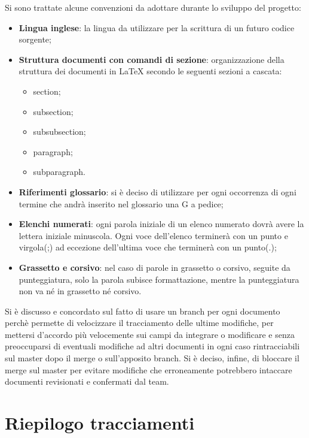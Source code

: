Si sono trattate alcune convenzioni da adottare durante lo sviluppo del 
progetto:
\begin{itemize}
\item \textbf{Lingua inglese}: la lingua da utilizzare per la scrittura di un 
futuro codice sorgente;
\item \textbf{Struttura documenti con comandi di sezione}: organizzazione della 
struttura dei documenti in \LaTeX{} secondo le seguenti sezioni a cascata:
\begin{itemize}
	\item section;
	\item subsection;
	\item subsubsection;
	\item paragraph;
	\item subparagraph.
\end{itemize}
\item \textbf{Riferimenti glossario}: si è deciso di utilizzare per ogni 
occorrenza di ogni termine che andrà inserito nel glossario una G a pedice;
\item \textbf{Elenchi numerati}: ogni parola iniziale di un elenco numerato 
dovrà avere la lettera iniziale minuscola. Ogni voce dell'elenco terminerà con 
un punto e virgola(;) ad eccezione dell'ultima voce che terminerà con un 
punto(.);
\item \textbf{Grassetto e corsivo}: nel caso di parole in grassetto o corsivo, 
seguite da punteggiatura, solo la parola subisce formattazione, mentre la 
punteggiatura non va né in grassetto né corsivo.
\end{itemize}
Si è discusso e concordato sul fatto di usare un branch per ogni documento 
perchè permette di velocizzare il tracciamento delle ultime modifiche, per 
mettersi d'accordo più velocemente sui campi da integrare o modificare e senza 
preoccuparsi di eventuali modifiche ad altri documenti in ogni caso 
rintracciabili sul master dopo il merge o sull'apposito branch. Si è deciso, 
infine, di bloccare il merge sul master per evitare modifiche che erroneamente 
potrebbero intaccare documenti revisionati e confermati dal team.


\pagebreak
\section{Riepilogo tracciamenti}

